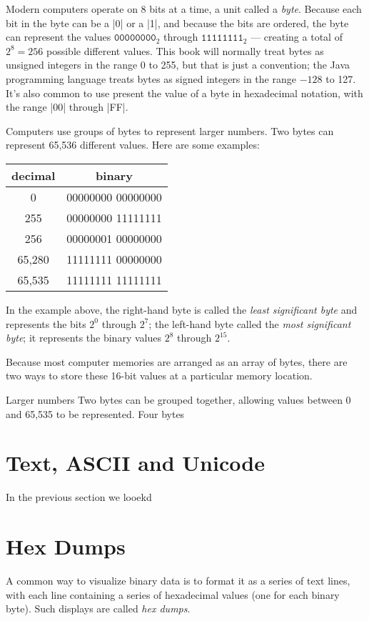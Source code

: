 \documentclass[11pt,letter]{book}
\begin{document}
Modern computers operate on 8 bits at a time, a unit called a
\emph{byte}. Because each bit in the byte can be a |0| or a |1|, and
because the bits are ordered, the byte can represent the values
$\texttt{00000000}_2$ through $\texttt{11111111}_2$ --- creating a
total of $2^8=256$ possible different values. This book will normally treat
bytes as unsigned integers in the range 0 to 255, but that is just a
convention; the Java programming language treats bytes as signed
integers in the range $-128$ to 127. It's also common to use present
the value of a byte in hexadecimal notation, with the range |00|
through |FF|.

Computers use groups of bytes to represent larger numbers. Two bytes
can represent 65,536 different values. Here are some examples:

\begin{tabular}{cc}
decimal & binary \\
\hline
0      & 00000000 00000000 \\
255    & 00000000 11111111 \\
256    & 00000001 00000000 \\
65,280 & 11111111 00000000 \\
65,535 & 11111111 11111111 \\
\hline
\end{tabular}

In the example above, the right-hand byte is called the \emph{least
  significant byte} and represents the bits $2^0$ through $2^7$; the
left-hand byte  called the \emph{most
significant byte}; it represents the binary values $2^8$ through
$2^{15}$. 



Because most computer memories are arranged as an array of bytes,
there are two ways to store these 16-bit values at a particular memory
location. 



Larger numbers Two bytes can be grouped together, allowing values between 0 and
65,535 to be represented. Four bytes

\section{Text, ASCII and Unicode}

In the previous section we looekd 

\section{Hex Dumps}\label{sec:hex-dumps}
A common way to visualize binary data is to format it as a series of
text lines, with each line containing a series of hexadecimal values (one
for each binary byte). Such displays are called \emph{hex
  dumps}.
\end{document}
